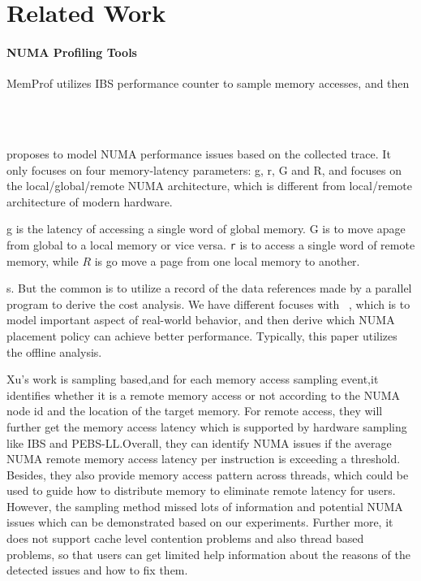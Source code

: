 \section{Related Work}
\label{sec:related}

\paragraph{NUMA Profiling Tools} 

MemProf utilizes IBS performance counter to sample memory accesses, and then ~\cite{Lachaize:2012:MMP:2342821.2342826}

~\cite{Bolosky:1991:NPR:106972.106994} 

proposes to model NUMA performance issues based on the collected trace. It only focuses on four memory-latency parameters: g, r, G and R, and focuses on the local/global/remote NUMA architecture, which is different from local/remote architecture of modern hardware. 

g is the latency of accessing a single word of  global memory. G is to move apage from global to a local memory or vice versa. \texttt{r} is to access a single word of remote memory, while  $R$ is go move a page from one local memory to another. 

s. 
But the common is to utilize a record of the data references made by a parallel program to derive the cost analysis. 
We have different focuses with ~\cite{Bolosky:1991:NPR:106972.106994}, which is to model important aspect of real-world behavior, and then derive which NUMA placement policy can achieve better performance. Typically, this paper utilizes the offline analysis.  

Xu's work\cite{10.1145/2692916.2555271} is sampling based,and for each memory access sampling event,it identifies whether it is a remote memory access or not according to the NUMA node id and the location of the target memory. For remote access, they will further get the memory access latency which is supported by hardware sampling like IBS and PEBS-LL.Overall, they can identify NUMA issues if the average NUMA remote memory access latency per instruction is exceeding a threshold. Besides, they also provide memory access pattern across threads, which could be used to guide how to distribute memory to eliminate remote latency for users. However, the sampling method missed lots of information and potential NUMA issues which can be demonstrated based on our experiments. Further more, it does not support cache level contention problems and also thread based problems, so that users can get limited help information about the reasons of the detected issues and how to fix them. 

